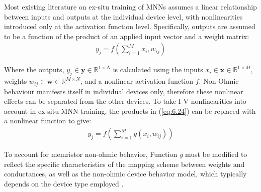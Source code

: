 \noindent Most existing literature on ex-situ training of MNNs assumes a linear relationship between inputs and outputs at the individual device level, with nonlinearities introduced only at the activation function level. Specifically, outputs are assumed to be a function of the product of an applied input vector and a weight matrix:
\begin{align}
y_j = f\left( \sum_{i=1}^{M} x_i, w_{ij} \right) \label{eq:6.24}
\end{align}


\noindent Where the outputs, $y_j \in \textbf{y} \in \mathbb{R}^{1 \times N}$ is calculated using the inputs $x_i \in \textbf{x} \in \mathbb{R}^{1 \times M}$, weights $w_{ij} \in \textbf{w} \in \mathbb{R}^{M \times N}$, and a nonlinear activation function $f$. Non-Ohmic behaviour manifests itself in individual devices only, therefore these nonlinear effects can be separated from the other devices. To take I-V nonlinearities into account in ex-situ MNN training, the products in (\ref{eq:6.24}) can be replaced with a nonlinear function to give:
\begin{align}
y_j = f\left( \sum_{i=1}^{M} g \left( x_i, w_{ij} \right) \right) \label{eq:6.25}
\end{align}


\noindent To account for memristor non-ohmic behavior, Function \textit{g} must be modified to reflect the specific characteristics of the mapping scheme between weights and conductances, as well as the non-ohmic device behavior model, which typically depends on the device type employed \cite{joksas2022nonideality}.\\


